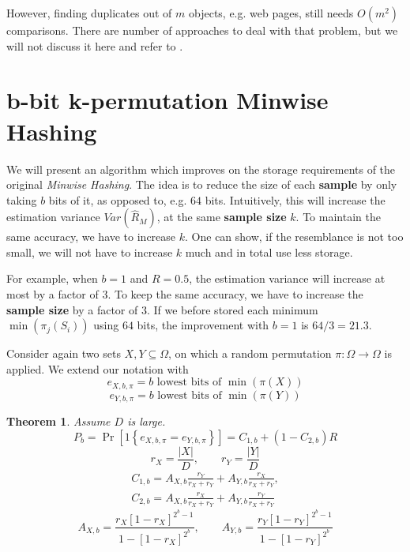 \documentclass[a4paper]{article}
\newtheorem{mytheorem}{Theorem}
\begin{document}
However, finding duplicates out of $m$ objects, e.g. web pages, still needs $O(m^2)$ comparisons. There are number of approaches to deal with that problem, but we will not discuss it here and refer to \citep{BroderGMZ97,STOC02*380}.


\section{b-bit k-permutation Minwise Hashing}\label{sec:b-bitMinwiseHashing}

We will present an algorithm which improves on the storage requirements of the original \emph{Minwise Hashing}. The idea is to reduce the size of each \textbf{sample} by only taking $b$ bits of it, as opposed to, e.g. $64$ bits. Intuitively, this will increase the estimation variance $Var(\hat{R}_M)$, at the same \textbf{sample size} $k$. To maintain the same accuracy, we have to increase $k$. One can show, if the resemblance is not too small, we will not have to increase $k$ much and in total use less storage.

For example, when $b=1$ and $R=0.5$, the estimation variance will increase at most by a factor of $3$. To keep the same accuracy, we have to increase the \textbf{sample size} by a factor of $3$. If we before stored each minimum $\min(\pi_j(S_i))$ using $64$ bits, the improvement with $b=1$ is $64/3=21.3$.

Consider again two sets $X,Y \subseteq \Omega$, on which a random permutation $\pi: \Omega \longrightarrow \Omega$ is applied. We extend our notation with
\[
e_{X,b,\pi}=b \text{ lowest bits of } \min(\pi(X))
\]
\[
e_{Y,b,\pi}=b \text{ lowest bits of } \min(\pi(Y))
\]
\begin{framed}
\begin{mytheorem} \label{the:b-bitMinwiseHashing}
Assume $D$ is large.
\begin{equation}\label{eq:minwiseB-bit}
P_b=\Pr[1\left\lbrace e_{X,b,\pi}=e_{Y,b,\pi}\right\rbrace]=C_{1,b}+(1-C_{2,b})R
\end{equation}
\begin{equation}
r_X=\frac{|X|}{D}, \qquad r_Y=\frac{|Y|}{D}
\end{equation}
\begin{equation}
\begin{split}
C_{1,b}=A_{X,b}\frac{r_Y}{r_X+r_Y}+A_{Y,b}\frac{r_X}{r_X+r_Y},\\
C_{2,b}=A_{X,b}\frac{r_X}{r_X+r_Y}+A_{Y,b}\frac{r_Y}{r_X+r_Y}
\end{split}
\end{equation}
\begin{equation}
A_{X,b}=\frac{r_X[1-r_X]^{2^b-1}}{1-[1-r_X]^{2^b}}, \qquad A_{Y,b}=\frac{r_Y[1-r_Y]^{2^b-1}}{1-[1-r_Y]^{2^b}}
\end{equation}
\end{mytheorem}
\end{framed}
\end{document}
